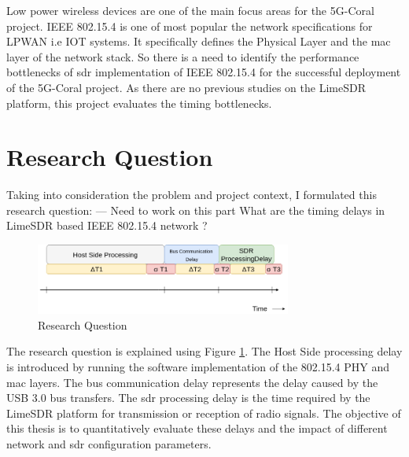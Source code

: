 Low power wireless devices are one of the main focus areas for the 5G-Coral project.
IEEE 802.15.4 is one of most popular the network specifications for \ac{LPWAN} i.e \ac{IOT} systems.
It specifically defines the Physical Layer and the \ac{mac} layer of the network stack.
So there is a need to identify the performance bottlenecks of \ac{sdr} implementation of IEEE 802.15.4 for the successful deployment of the 5G-Coral project.
As there are no previous studies on the LimeSDR platform, this project evaluates the timing bottlenecks.









\section{Research Question}
Taking into consideration the problem and project context, I formulated this research question:
--- Need to work on this part
What are the timing delays in  LimeSDR based IEEE 802.15.4 network ?
\begin{figure}[!h]
\centering
\includegraphics[width=0.75\textwidth]{Figure/RQ1.png}
\caption{Research Question}
\label{rq1}
\end{figure}

The research question is explained using Figure \ref{rq1}.
The Host Side processing delay is introduced by running the software implementation of the 802.15.4 \ac{PHY} and \ac{mac} layers.
The bus communication delay represents the delay caused by the \ac{USB} 3.0 bus transfers.
The \ac{sdr} processing delay is the time required by the LimeSDR platform for transmission or reception of radio signals.
The objective of this thesis is to quantitatively evaluate these delays and the impact of different network and \ac{sdr} configuration parameters.

